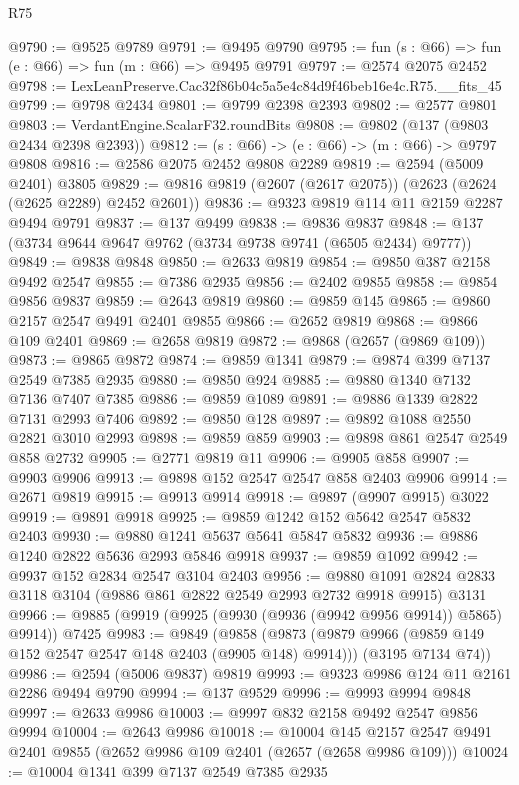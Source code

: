 \begin{lexlean}{R75}
\begin{coremodule}
@9790 := @9525 @9789
@9791 := @9495 @9790
@9795 := fun (s : @66) => fun (e : @66) => fun (m : @66) => @9495 @9791
@9797 := @2574 @2075 @2452
@9798 := LexLeanPreserve.Cac32f86b04c5a5e4c84d9f46beb16e4c.R75.__fits_45
@9799 := @9798 @2434
@9801 := @9799 @2398 @2393
@9802 := @2577 @9801
@9803 := VerdantEngine.ScalarF32.roundBits
@9808 := @9802 (@137 (@9803 @2434 @2398 @2393))
@9812 := (s : @66) -> (e : @66) -> (m : @66) -> @9797 @9808
@9816 := @2586 @2075 @2452 @9808 @2289
@9819 := @2594 (@5009 @2401) @3805
@9829 := @9816 @9819 (@2607 (@2617 @2075)) (@2623 (@2624 (@2625 @2289) @2452 @2601))
@9836 := @9323 @9819 @114 @11 @2159 @2287 @9494 @9791
@9837 := @137 @9499
@9838 := @9836 @9837
@9848 := @137 (@3734 @9644 @9647 @9762 (@3734 @9738 @9741 (@6505 @2434) @9777))
@9849 := @9838 @9848
@9850 := @2633 @9819
@9854 := @9850 @387 @2158 @9492 @2547
@9855 := @7386 @2935
@9856 := @2402 @9855
@9858 := @9854 @9856 @9837
@9859 := @2643 @9819
@9860 := @9859 @145
@9865 := @9860 @2157 @2547 @9491 @2401 @9855
@9866 := @2652 @9819
@9868 := @9866 @109 @2401
@9869 := @2658 @9819
@9872 := @9868 (@2657 (@9869 @109))
@9873 := @9865 @9872
@9874 := @9859 @1341
@9879 := @9874 @399 @7137 @2549 @7385 @2935
@9880 := @9850 @924
@9885 := @9880 @1340 @7132 @7136 @7407 @7385
@9886 := @9859 @1089
@9891 := @9886 @1339 @2822 @7131 @2993 @7406
@9892 := @9850 @128
@9897 := @9892 @1088 @2550 @2821 @3010 @2993
@9898 := @9859 @859
@9903 := @9898 @861 @2547 @2549 @858 @2732
@9905 := @2771 @9819 @11
@9906 := @9905 @858
@9907 := @9903 @9906
@9913 := @9898 @152 @2547 @2547 @858 @2403 @9906
@9914 := @2671 @9819
@9915 := @9913 @9914
@9918 := @9897 (@9907 @9915) @3022
@9919 := @9891 @9918
@9925 := @9859 @1242 @152 @5642 @2547 @5832 @2403
@9930 := @9880 @1241 @5637 @5641 @5847 @5832
@9936 := @9886 @1240 @2822 @5636 @2993 @5846 @9918
@9937 := @9859 @1092
@9942 := @9937 @152 @2834 @2547 @3104 @2403
@9956 := @9880 @1091 @2824 @2833 @3118 @3104 (@9886 @861 @2822 @2549 @2993 @2732 @9918 @9915) @3131
@9966 := @9885 (@9919 (@9925 (@9930 (@9936 (@9942 @9956 @9914)) @5865) @9914)) @7425
@9983 := @9849
    (@9858
      (@9873 (@9879 @9966 (@9859 @149 @152 @2547 @2547 @148 @2403 (@9905 @148) @9914)))
      (@3195 @7134 @74))
@9986 := @2594 (@5006 @9837) @9819
@9993 := @9323 @9986 @124 @11 @2161 @2286 @9494 @9790
@9994 := @137 @9529
@9996 := @9993 @9994 @9848
@9997 := @2633 @9986
@10003 := @9997 @832 @2158 @9492 @2547 @9856 @9994
@10004 := @2643 @9986
@10018 := @10004
    @145
    @2157
    @2547
    @9491
    @2401
    @9855
    (@2652 @9986 @109 @2401 (@2657 (@2658 @9986 @109)))
@10024 := @10004 @1341 @399 @7137 @2549 @7385 @2935

\end{coremodule}
\end{lexlean}
